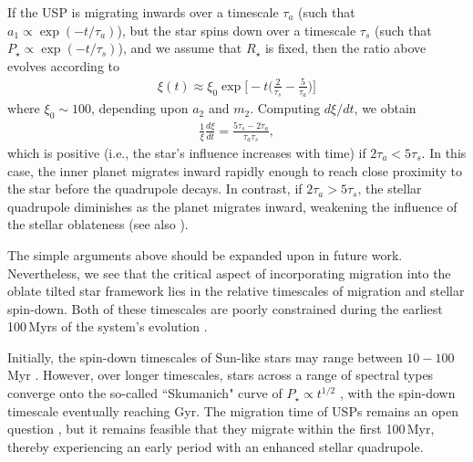 \documentclass[twocolumn]{aastex63}
\begin{document}
If the USP is migrating inwards over a timescale $\tau_a$ (such that $a_1\propto \exp(-t/\tau_a)$), but the star spins down over a timescale $\tau_{s}$ (such that $P_\star\propto \exp(-t/\tau_s)$), and we assume that $R_\star$ is fixed, then the ratio above evolves according to
\begin{align}
    \xi(t)\approx \xi_0 \exp\Bigg[-t\bigg(\frac{2}{\tau_s}-\frac{5 }{\tau_a}\bigg)\Bigg]
\end{align}
where $\xi_0\sim 100$, depending upon $a_2$ and $m_2$. Computing $d\xi/dt$, we obtain
\begin{align}
    \frac{1}{\xi}\frac{d\xi}{dt}=\frac{5\tau_s-2\tau_a}{\tau_a\tau_s},
\end{align}
which is positive (i.e., the star's influence increases with time) if $2\tau_a<5\tau_s$. In this case, the inner planet migrates inward rapidly enough to reach close proximity to the star before the quadrupole decays. In contrast, if $2\tau_a>5\tau_s$, the stellar quadrupole diminishes as the planet migrates inward, weakening the influence of the stellar oblateness (see also \citealt{becker2020origin}). 

The simple arguments above should be expanded upon in future work. Nevertheless, we see that the critical aspect of incorporating migration into the oblate tilted star framework lies in the relative timescales of migration and stellar spin-down. Both of these timescales are poorly constrained during the earliest 100\,Myrs of the system's evolution \citep{bouvier2014angular,spalding2019stellar}.

Initially, the spin-down timescales of Sun-like stars may range between $10-100\,$Myr \citep{garraffo2018revolution,spalding2019stellar}. However, over longer timescales, stars across a range of spectral types converge onto the so-called ``Skumanich" curve of $P_\star\propto t^{1/2}$ \citep{skumanich1972time,garraffo2018revolution}, with the spin-down timescale eventually reaching Gyr. The migration time of USPs remains an open question \citep{winn2018kepler,lee2017magnetospheric,pu2019low,petrovich2019ultra}, but it remains feasible that they migrate within the first 100\,Myr, thereby experiencing an early period with an enhanced stellar quadrupole. 


\end{document}

